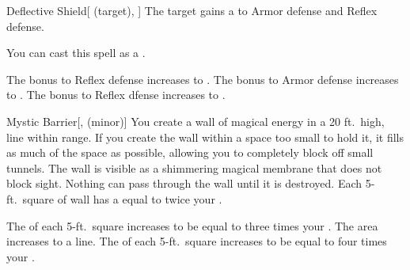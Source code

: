 \lowercase{\hypertarget{spell:Deflective Shield}{}}\label{spell:Deflective Shield}
\begin{attuneability}[Rank 1]{\hypertarget{spell:Deflective Shield}{Deflective Shield}}[ (target), ]
The target gains a   to Armor defense and Reflex defense.

You can cast this spell as a .

\rankline
{} The bonus to Reflex defense increases to .
 The bonus to Armor defense increases to .
 The bonus to Reflex dfense increases to .
\end{attuneability}
\vspace{0.25em}



\lowercase{\hypertarget{spell:Mystic Barrier}{}}\label{spell:Mystic Barrier}
\begin{freeability}[Rank 1]{\hypertarget{spell:Mystic Barrier}{Mystic Barrier}}[,  (minor)]
\targetrule
You create a wall of magical energy in a 20 ft.\ high, \areamed line within \rngmed range.
If you create the wall within a space too small to hold it, it fills as much of the space as possible, allowing you to completely block off small tunnels.
The wall is visible as a shimmering magical membrane that does not block sight.
Nothing can pass through the wall until it is destroyed.
Each 5-ft.\ square of wall has a  equal to twice your .

\rankline
{} The  of each 5-ft.\ square increases to be equal to three times your .
 The area increases to a \arealarge line.
 The  of each 5-ft.\ square increases to be equal to four times your .
\end{freeability}
\vspace{0.25em}



